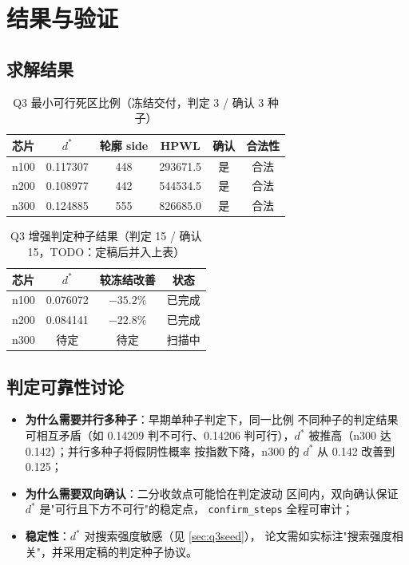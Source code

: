 \documentclass[12pt,a4paper]{article}
\begin{document}
\section{结果与验证}

\subsection{求解结果}

\begin{table}[H]
\centering
\small
\caption{Q3 最小可行死区比例（冻结交付，判定 3 / 确认 3 种子）}
\begin{tabular}{lccccc}
\toprule
芯片 & $d^*$ & 轮廓 side & HPWL & 确认 & 合法性 \\
\midrule
n100 & 0.117307 & 448 & 293671.5 & 是 & 合法 \\
n200 & 0.108977 & 442 & 544534.5 & 是 & 合法 \\
n300 & 0.124885 & 555 & 826685.0 & 是 & 合法 \\
\bottomrule
\end{tabular}
\end{table}

\begin{table}[H]
\centering
\small
\caption{Q3 增强判定种子结果（判定 15 / 确认 15，TODO：定稿后并入上表）}
\begin{tabular}{lccc}
\toprule
芯片 & $d^*$ & 较冻结改善 & 状态 \\
\midrule
n100 & 0.076072 & $-35.2\%$ & 已完成 \\
n200 & 0.084141 & $-22.8\%$ & 已完成 \\
n300 & 待定 & 待定 & 扫描中 \\
\bottomrule
\end{tabular}
\end{table}

\subsection{判定可靠性讨论}

\begin{itemize}
    \item \textbf{为什么需要并行多种子}：早期单种子判定下，同一比例
    不同种子的判定结果可相互矛盾（如 0.14209 判不可行、0.14206
    判可行），$d^*$ 被推高（n300 达 0.142）；并行多种子将假阴性概率
    按指数下降，n300 的 $d^*$ 从 0.142 改善到 0.125；
    \item \textbf{为什么需要双向确认}：二分收敛点可能恰在判定波动
    区间内，双向确认保证 $d^*$ 是"可行且下方不可行"的稳定点，
    \texttt{confirm\_steps} 全程可审计；
    \item \textbf{稳定性}：$d^*$ 对搜索强度敏感（见 \ref{sec:q3seed}），
    论文需如实标注"搜索强度相关"，并采用定稿的判定种子协议。
\end{itemize}
\end{document}
